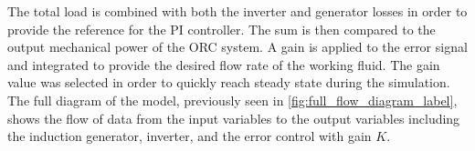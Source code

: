 The total load is combined with both the inverter and generator losses in order to provide the reference for the PI controller. The sum is then compared to the output mechanical power of the ORC system. A gain is applied to the error signal and integrated to provide the desired flow rate of the working fluid. The gain value was selected in order to quickly reach steady state during the simulation. The full diagram of the model, previously seen in \autoref{fig:full_flow_diagram_label}, shows the flow of data from the input variables to the output variables including the induction generator, inverter, and the error control with gain $K$.
%


\cleardoublepage